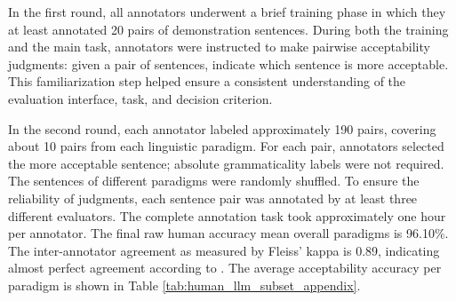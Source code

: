 \documentclass[11pt]{article}
\begin{document}
In the first round, all annotators underwent a brief training phase in which they at least annotated 20 pairs of demonstration sentences. During both the training and the main task, annotators were instructed to make pairwise acceptability judgments: given a pair of sentences, indicate which sentence is more acceptable. This familiarization step helped ensure a consistent understanding of the evaluation interface, task, and decision criterion.

In the second round, each annotator labeled approximately 190 pairs, covering about 10 pairs from each linguistic paradigm. For each pair, annotators selected the more acceptable sentence; absolute grammaticality labels were not required. The sentences of different paradigms were randomly shuffled. To ensure the reliability of judgments, each sentence pair was annotated by at least three different evaluators. The complete annotation task took approximately one hour per annotator. The final raw human accuracy mean overall paradigms is 96.10\%. The inter-annotator agreement as measured by Fleiss’ kappa is 0.89, indicating almost perfect agreement according to \cite{agreement}. The average acceptability accuracy per paradigm is shown in Table \ref{tab:human_llm_subset_appendix}.


\end{document}
